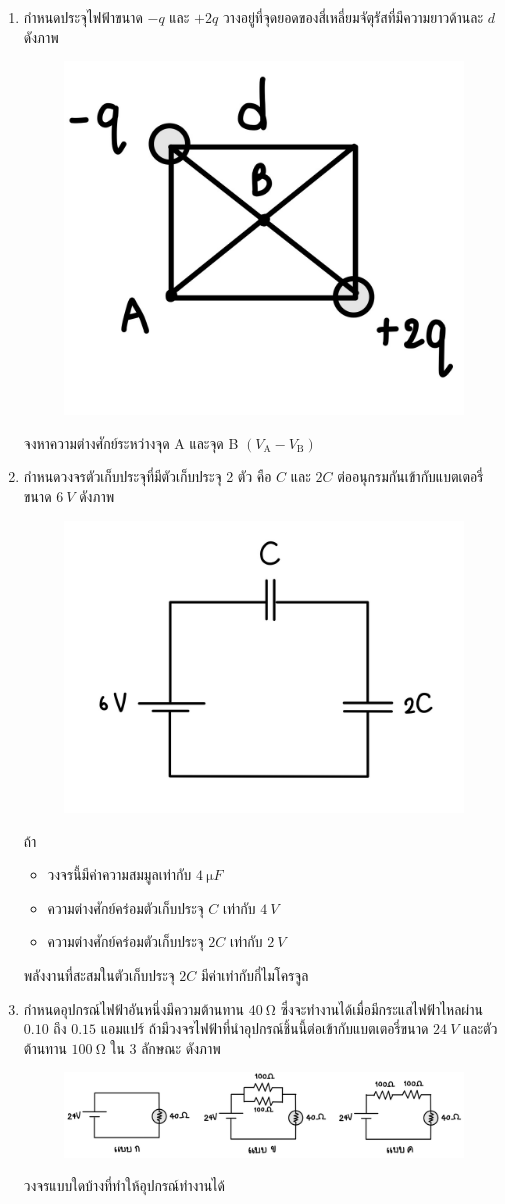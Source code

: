 \documentclass[a4paper,12pt]{article}
\begin{document}
\begin{enumerate}
		\item กำหนดประจุไฟฟ้าขนาด \(-q\) และ \(+2q\) วางอยู่ที่จุดยอดของสี่เหลี่ยมจัตุรัสที่มีความยาวด้านละ \(d\) ดังภาพ
		\begin{figure}[h]
			\centering
			\includegraphics[width=0.3\linewidth]{13}
		\end{figure}
	จงหาความต่างศักย์ระหว่างจุด A และจุด B \((V_\text{A}-V_\text{B})\)
			\vspace{4cm}
		
		\item กำหนดวงจรตัวเก็บประจุที่มีตัวเก็บประจุ 2 ตัว คือ \(C\) และ \(2C\) ต่ออนุกรมกันเข้ากับแบตเตอรี่ขนาด \(\SI{6}{V}\) ดังภาพ
		\begin{figure}[h]
			\centering
			\includegraphics[width=0.3\linewidth]{14}
		\end{figure}
		ถ้า
		\begin{itemize}
			\item วงจรนี้มีค่าความสมมูลเท่ากับ \(\SI{4}{\micro F}\)
			\item ความต่างศักย์คร่อมตัวเก็บประจุ \(C\) เท่ากับ \(\SI{4}{V}\)
			\item ความต่างศักย์คร่อมตัวเก็บประจุ \(2C\) เท่ากับ \(\SI{2}{V}\) 
		\end{itemize}
		พลังงานที่สะสมในตัวเก็บประจุ \(2C\) มีค่าเท่ากับกี่ไมโครจูล
			\vspace{4cm}

		\item กำหนดอุปกรณ์ไฟฟ้าอันหนึ่งมีความต้านทาน \(\SI{40}{\ohm}\) ซึ่งจะทำงานได้เมื่อมีกระแสไฟฟ้าไหลผ่าน \(0.10\) ถึง \(0.15\) แอมแปร์ ถ้ามีวงจรไฟฟ้าที่นำอุปกรณ์ชิ้นนี้ต่อเข้ากับแบตเตอรี่ขนาด \(\SI{24}{V}\) และตัวต้านทาน \(\SI{100}{\ohm}\) ใน 3 ลักษณะ ดังภาพ
		\begin{figure}[h]
			\centering
			\includegraphics[width=0.8\linewidth]{15}
		\end{figure}
		วงจรแบบใดบ้างที่ทำให้อุปกรณ์ทำงานได้
			\vspace{4cm}
		

\end{enumerate}
\end{document}
